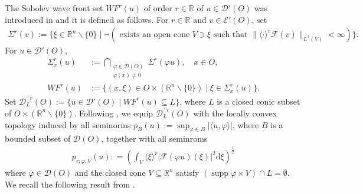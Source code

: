 \documentclass{amsart}
\newcommand{\supp}{\operatorname{supp}}
\theoremstyle{definition}
\begin{document}
The Sobolev wave front set $WF^r (u)$ of order $r\in\mathbb{R}$ of $u\in\mathcal{D}'(O)$ was introduced in \cite{Duistermaat} and it is defined as follows.
For $r\in\mathbb{R}$ and $v\in \mathcal{E}'(O)$, set
\begin{align*}
    \Sigma^r (v) := \{ \xi\in\mathbb{R}^n \backslash \{ 0 \} \mid \neg (\text{ exists an open cone $V\ni\xi$ such that } \|\langle\cdot\rangle^r\mathcal{F}(v)\|_{L^2(V)}<\infty) \}.
\end{align*}
For  $u\in \mathcal{D}'(O)$,
\begin{align*}
    \Sigma_x ^r (u)
    &:= \bigcap_{ \substack{\varphi\in \mathcal{D} (O) \\ \varphi (x) \neq 0}} \Sigma^r (\varphi u), \quad x\in O, \\
    WF^r (u) &:= \{ (x,\xi)\in O \times (\mathbb{R}^n \backslash \{ 0 \}) \mid \xi \in \Sigma_x ^r (u) \}.
\end{align*}
Set $\mathcal{D}_{L}^{\,\prime\, r} (O) := \{ u\in \mathcal{D}' (O) \mid  WF^r (u) \subseteq L\}$, where $L$ is a closed conic subset of $O \times (\mathbb{R}^n \backslash \{ 0 \})$. Following \cite{PP}, we equip $\mathcal{D}_{L}^{\,\prime\, r} (O)$ with the locally convex topology induced by all seminorms $p_B (u) := \sup_{\varphi\in B} |\langle u,\varphi \rangle|$, where $B$ is a bounded subset of $\mathcal{D}(O)$, together with all seminroms
\begin{align*}
p_{r;\varphi , V} (u): = \left( \int_V \langle \xi \rangle^r |\mathcal{F} (\varphi u) (\xi)|^2 \mathrm{d} \xi \right)^{\frac{1}{2}}
\end{align*}
where $\varphi\in\mathcal{D} (O)$ and the closed cone $V\subseteq\mathbb{R}^n$ satisfy $(\supp \varphi \times V)\cap L = \emptyset$. We recall the following result from \cite{PP}.
\end{document}
